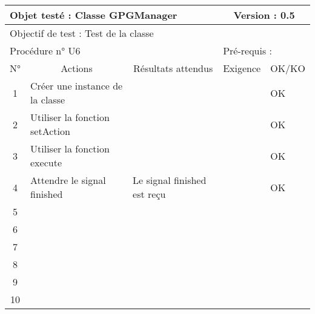 \documentclass{../res/univ-projet}
\begin{document}
\begin{center}
    \begin{tabular}{|c|p{5cm}|p{5cm}|p{1.5cm}|p{1.5cm}|}
      \hline
      \multicolumn{3}{|l|}{Objet testé : Classe GPGManager} & \multicolumn{2}{c|}{Version : 0.5}\\ \hline
      \multicolumn{5}{|l|}{Objectif de test : Test de la classe}\\ \hline
      \multicolumn{3}{|l|}{Procédure n° U6} & \multicolumn{2}{p{3cm}|}{Pré-requis : }\\ \hline
      \multicolumn{1}{|c|}{N°} & \multicolumn{1}{c|}{Actions} & \multicolumn{1}{c|}{Résultats attendus} & 
      \multicolumn{1}{c|}{Exigence} & \multicolumn{1}{c|}{OK/KO}\\ \hline
      1 & Créer une instance de la classe &  &  & OK \\
      2 & Utiliser la fonction setAction &  &  & OK \\
      3 & Utiliser la fonction execute &  &  & OK \\
      4 & Attendre le signal finished & Le signal finished est reçu &  & OK \\
      5 &  & &  & \\
      6 &  &  &  &  \\
      7 &  &  &  &  \\
      8 &  &  &  &  \\
      9 &  &  &  & \\
      10 &  &  &  & \\ 
	\hline
    \end{tabular}
    \vskip 2.2cm
	


\end{center}
\end{document}
